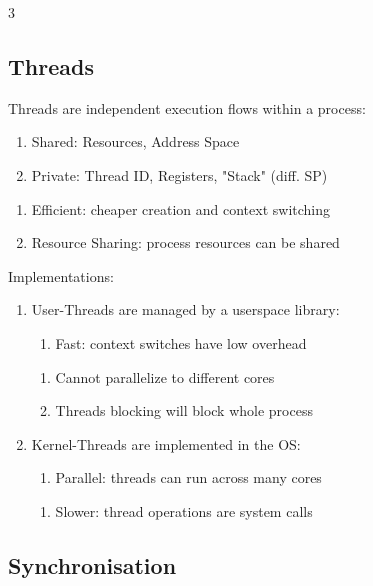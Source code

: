 \documentclass[12pt, a4paper]{article}
\begin{document}
\begin{multicols*}{3}
\subsection{Threads}
Threads are independent execution flows within a process:
\begin{enumerate}[\roman*.]
  \item Shared: Resources, Address Space 
  \item Private: Thread ID, Registers, "Stack" (diff. SP)
\end{enumerate}\vspace{-1pt}
\begin{enumerate}[$+$]
  \item Efficient: cheaper creation and context switching
  \item Resource Sharing: process resources can be shared
\end{enumerate}\vspace{-1pt}
{\centering
\par}
Implementations:
\begin{enumerate}[\roman*.]
  \item User-Threads are managed by a userspace library:
    \begin{enumerate}[$+$]\vspace{3pt}
    \item Fast: context switches have low overhead
  \end{enumerate}
  \begin{enumerate}[$-$]\vspace{5pt}
    \item Cannot parallelize to different cores 
    \item Threads blocking will block whole process
  \end{enumerate}
\item Kernel-Threads are implemented in the OS:
  \begin{enumerate}[$+$]\vspace{3pt}
    \item Parallel: threads can run across many cores 
  \end{enumerate}
  \begin{enumerate}[$-$]\vspace{5pt}
    \item Slower: thread operations are system calls
  \end{enumerate}
\end{enumerate}
\vspace{-1em}
\colbreak 
\subsection{Synchronisation}


\end{multicols*}
\end{document}
